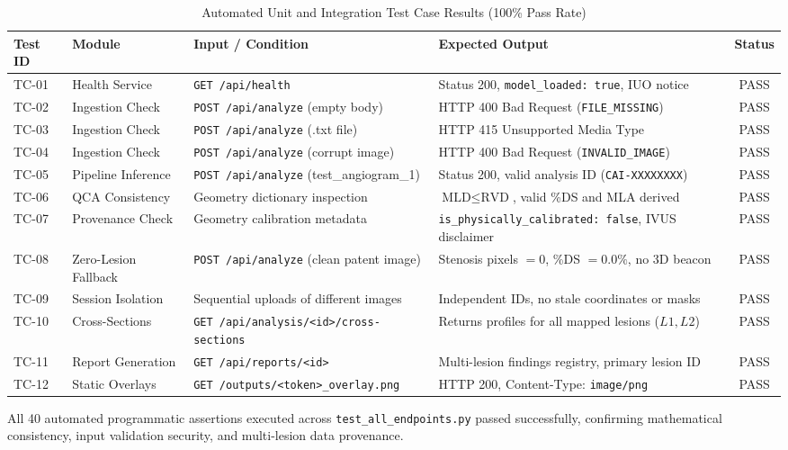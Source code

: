 \begin{table}[H]
\centering
\caption{Automated Unit and Integration Test Case Results (100\% Pass Rate)}
\label{tab:test_cases}
\small
\begin{tabular}{p{1.2cm}p{2.6cm}p{3.8cm}p{3.8cm}c}
\toprule
\textbf{Test ID} & \textbf{Module} & \textbf{Input / Condition} & \textbf{Expected Output} & \textbf{Status} \\
\midrule
TC-01 & Health Service & \texttt{GET /api/health} & Status 200, \texttt{model\_loaded: true}, IUO notice & PASS \\
TC-02 & Ingestion Check & \texttt{POST /api/analyze} (empty body) & HTTP 400 Bad Request (\texttt{FILE\_MISSING}) & PASS \\
TC-03 & Ingestion Check & \texttt{POST /api/analyze} (.txt file) & HTTP 415 Unsupported Media Type & PASS \\
TC-04 & Ingestion Check & \texttt{POST /api/analyze} (corrupt image) & HTTP 400 Bad Request (\texttt{INVALID\_IMAGE}) & PASS \\
TC-05 & Pipeline Inference & \texttt{POST /api/analyze} (test\_angiogram\_1) & Status 200, valid analysis ID (\texttt{CAI-XXXXXXXX}) & PASS \\
TC-06 & QCA Consistency & Geometry dictionary inspection & $\text{MLD} \le \text{RVD}$, valid \%DS and MLA derived & PASS \\
TC-07 & Provenance Check & Geometry calibration metadata & \texttt{is\_physically\_calibrated: false}, IVUS disclaimer & PASS \\
TC-08 & Zero-Lesion Fallback & \texttt{POST /api/analyze} (clean patent image) & Stenosis pixels $= 0$, \%DS $= 0.0\%$, no 3D beacon & PASS \\
TC-09 & Session Isolation & Sequential uploads of different images & Independent IDs, no stale coordinates or masks & PASS \\
TC-10 & Cross-Sections & \texttt{GET /api/analysis/<id>/cross-sections} & Returns profiles for all mapped lesions ($L1, L2$) & PASS \\
TC-11 & Report Generation & \texttt{GET /api/reports/<id>} & Multi-lesion findings registry, primary lesion ID & PASS \\
TC-12 & Static Overlays & \texttt{GET /outputs/<token>\_overlay.png} & HTTP 200, Content-Type: \texttt{image/png} & PASS \\
\bottomrule
\end{tabular}
\end{table}

All 40 automated programmatic assertions executed across \texttt{test\_all\_endpoints.py} passed successfully, confirming mathematical consistency, input validation security, and multi-lesion data provenance.
